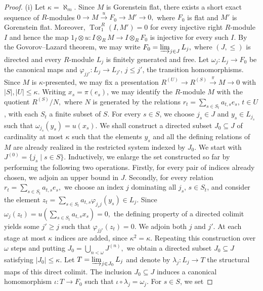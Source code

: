 \documentclass[12pt]{amsart}
\theoremstyle{remark}
\theoremstyle{definition}
\theoremstyle{plain}
\DeclareMathOperator{\Tor}{Tor}
\begin{document}
\begin{proof}

(i) Let $\kappa=\aleph_m$. Since $M$ is Gorenstein flat, there exists a
short exact sequence of $R$-modules $0\rightarrow M \xrightarrow{\,u\,} F_0 \rightarrow M'
\rightarrow 0,$
where $F_0$ is flat and $M'$ is Gorenstein flat. Moreover,
$
\Tor_1^R(I,M')=0
$
for every injective right $R$-module $I$ and hence the map
$
1_I\otimes u:I\otimes_R M\rightarrow I\otimes_R F_0$
is injective for every such $I$. By the Govorov--Lazard theorem, we may write $F_0=\varinjlim_{j\in J}L_j,$
where $(J,\leq)$ is directed and every $R$-module $L_j$ is finitely generated and
free. Let $\omega_j:L_j\rightarrow F_0$
be the canonical maps and
$\varphi_{jj'}:L_j\rightarrow L_{j'}$,
$j\leq j'$, the transition homomorphisms.
Since $M$ is $\kappa$-presented, we may fix a presentation $R^{(U)}\rightarrow R^{(S)}
\xrightarrow{\pi}M\rightarrow 0$
with
$|S|,|U|\leq\kappa.$
Writing $x_s=\pi(e_s)$, we may identify the $R$-module
$
M$ with the quotient $R^{(S)}/N,$
where $N$ is generated by the relations $r_t=\sum_{s\in S_t}a_{t,s}e_s$, $t\in U$, with each $S_t$ a finite subset of $S$. For every $s\in S$, we choose $j_s\in J$ and $y_s\in L_{j_s}$ such that
$\omega_{j_s}(y_s)=u(x_s).$
We shall construct a directed subset $J_0\subseteq J$ of cardinality
at most $\kappa$ such that the elements $y_s$ and all the defining
relations of $M$ are already realized in the restricted system
indexed by $J_0$.
We start with $J^{(0)}=\{j_s\mid s\in S\}.$
Inductively, we enlarge the set constructed so far by performing the
following two operations. Firstly, for every pair of indices already
chosen, we adjoin an upper bound in $J$. Secondly, for every relation
$r_t=\sum_{s\in S_t}a_{t,s}e_s,$ we
choose an index $j$ dominating all $j_s$, $s\in S_t$, and consider the element
$z_t=
\sum_{s\in S_t}
a_{t,s}\varphi_{j_sj}(y_s)\in L_j.$
Since
$
\omega_j(z_t)
=
u\left(\sum_{s\in S_t}a_{t,s}x_s\right)
=0,$
the defining property of a directed colimit yields some $j'\geq j$
such that
$
\varphi_{jj'}(z_t)=0.$ We adjoin both $j$ and $j'$. At each stage at most $\kappa$ indices are added, since
$\kappa^2=\kappa$. Repeating this construction over $\omega$ steps and
putting $J_0=\bigcup_{n<\omega}J^{(n)},$
we obtain a directed subset $J_0\subseteq J$ satisfying
$
|J_0|\leq\kappa.$
Let
$
T=\varinjlim_{j\in J_0}L_j$ and denote by
$
\lambda_j:L_j\rightarrow T
$
the structural maps of this direct colimit. The inclusion $J_0\subseteq J$ induces a
canonical homomorphism $\iota:T\rightarrow F_0$
such that $\iota \circ \lambda_j=\omega_j.$ For $s\in S$, we set

\end{proof}
\end{document}
